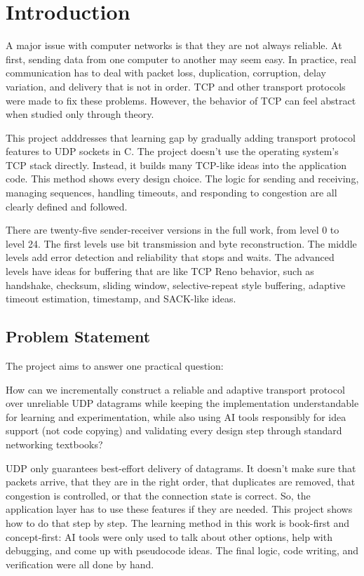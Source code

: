 \chapter{Introduction}
A major issue with computer networks is that they are not always reliable. At
first, sending data from one computer to another may seem easy. In practice,
real communication has to deal with packet loss, duplication, corruption,
delay variation, and delivery that is not in order. TCP and other transport
protocols were made to fix these problems. However, the behavior of TCP can
feel abstract when studied only through theory.

This project adddresses that learning gap by gradually adding transport
protocol features to UDP sockets in C. The project doesn't use the operating
system's TCP stack directly. Instead, it builds many TCP-like ideas into the
application code. This method shows every design choice. The logic for sending
and receiving, managing sequences, handling timeouts, and responding to
congestion are all clearly defined and followed.

There are twenty-five sender-receiver versions in the full work, from level 0
to level 24. The first levels use bit transmission and byte reconstruction.
The middle levels add error detection and reliability that stops and waits. The
advanced levels have ideas for buffering that are like TCP Reno behavior, such
as handshake, checksum, sliding window, selective-repeat style buffering,
adaptive timeout estimation, timestamp, and SACK-like ideas.

\clearpage
\section{Problem Statement}
The project aims to answer one practical question:

\begin{displayquote}\raggedright\doublespacing
How can we incrementally construct a reliable and adaptive transport protocol over unreliable UDP datagrams while keeping the implementation understandable for learning and experimentation, while also using AI tools responsibly for idea support (not code copying) and validating every design step through standard networking textbooks?
\end{displayquote}

\vspace{\baselineskip}

UDP only guarantees best-effort delivery of datagrams. It doesn't make sure
that packets arrive, that they are in the right order, that duplicates are
removed, that congestion is controlled, or that the connection state is
correct. So, the application layer has to use these features if they are
needed. This project shows how to do that step by step. The learning method in
this work is book-first and concept-first: AI tools were only used to talk
about other options, help with debugging, and come up with pseudocode ideas.
The final logic, code writing, and verification were all done by hand.

